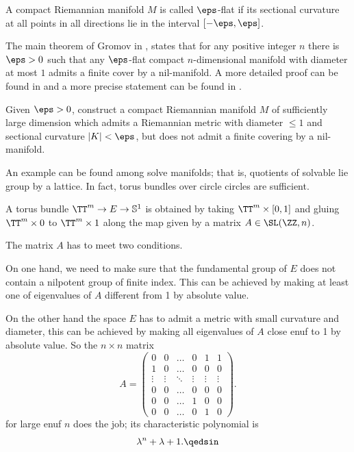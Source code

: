 A compact Riemannian manifold $M$ is called $\eps$-flat if its sectional curvature at all points in all directions lie in the interval $[-\eps,\eps]$. 

The main theorem of Gromov in \cite{gromov-almost-flat}, 
states that for any positive integer $n$ there is $\eps>0$ such that any $\eps$-flat compact $n$-dimensional manifold with diameter at most $1$ admits a finite cover by a nil-manifold.
A more detailed proof can be found in \cite{buser-karcher}
and a more precise statement can be found in \cite{ruh}.

\begin{pr}
Given $\eps>0$, construct a compact Riemannian manifold $M$ of sufficiently large dimension which admits a Riemannian metric with diameter $\le 1$ and sectional
curvature $|K|<\eps$,
but does not admit a finite covering by a nil-manifold.
\end{pr}


An example can be found among solve manifolds;
that is, quotients of solvable lie group by a lattice.
In fact, torus bundles over circle circles are sufficient.

\medskip

A torus bundle $\TT^m\to E\to\mathbb{S}^1$ is obtained by taking $\TT^m\times [0,1]$ and gluing $\TT^m\times 0$ to $\TT^m\times 1$ along the map given by a matrix $A\in \SL(\ZZ,n)$.

The matrix $A$ has to meet two conditions.

On one hand, we need to make sure that the fundamental group of $E$ does not contain a nilpotent group of finite index.
This can be achieved by making at least one of eigenvalues of $A$ different from 1 by absolute value.

On the other hand the space $E$ has to admit a metric with small curvature and diameter, this can be achieved by making all 
eigenvalues of $A$ close enuf to 1 by absolute value.
So the $n{\times}n$ matrix 
\[A=
\left(
\begin{matrix}
0&0&\dots&0&1&1
\\
1&0&\dots&0&0&0
\\
\vdots&\vdots&\ddots&\vdots&\vdots&\vdots
\\
0&0&\dots&0&0&0
\\
0&0&\dots&1&0&0
\\
0&0&\dots&0&1&0
\end{matrix}
\right).
\]
for large enuf $n$ does the job;
its characteristic polynomial is 
\[\lambda^n+\lambda+1.\qedsin\] 
\medskip

